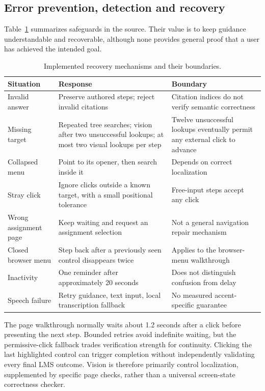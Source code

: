 \documentclass[11pt,a4paper]{article}
\begin{document}
\subsection{Error prevention, detection and recovery}
Table~\ref{tab:recovery} summarizes safeguards in the source. Their value is to keep guidance understandable and recoverable, although none provides general proof that a user has achieved the intended goal.
\begin{table}[htbp]\centering\small
\caption{Implemented recovery mechanisms and their boundaries.}\label{tab:recovery}
\begin{tabularx}{\linewidth}{>{\raggedright\arraybackslash}p{.21\linewidth}>{\raggedright\arraybackslash}X>{\raggedright\arraybackslash}X}\toprule
Situation & Response & Boundary\\\midrule
Invalid answer & Preserve authored steps; reject invalid citations & Citation indices do not verify semantic correctness\\
Missing target & Repeated tree searches; vision after two unsuccessful lookups; at most two visual lookups per step & Twelve unsuccessful lookups eventually permit any external click to advance\\
Collapsed menu & Point to its opener, then search inside it & Depends on correct localization\\
Stray click & Ignore clicks outside a known target, with a small positional tolerance & Free-input steps accept any click\\
Wrong assignment page & Keep waiting and request an assignment selection & Not a general navigation repair mechanism\\
Closed browser menu & Step back after a previously seen control disappears twice & Applies to the browser-menu walkthrough\\
Inactivity & One reminder after approximately 20 seconds & Does not distinguish confusion from delay\\
Speech failure & Retry guidance, text input, local transcription fallback & No measured accent-specific guarantee\\\bottomrule
\end{tabularx}\end{table}

The page walkthrough normally waits about 1.2 seconds after a click before presenting the next step. Bounded retries avoid indefinite waiting, but the permissive-click fallback trades verification strength for continuity. Clicking the last highlighted control can trigger completion without independently validating every final LMS outcome. Vision is therefore primarily control localization, supplemented by specific page checks, rather than a universal screen-state correctness checker.
\end{document}
